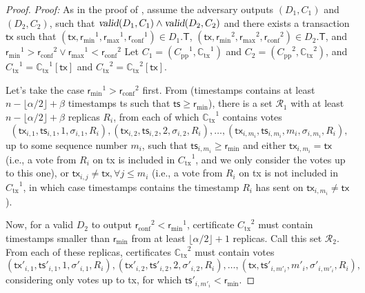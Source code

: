 \documentclass[pdflatex,sn-mathphys-num]{sn-jnl}%
\theoremstyle{thmstyleone}%
\theoremstyle{thmstyletwo}%
\theoremstyle{thmstylethree}%
\newcommand{\CR}{\ensuremath{\mathcal{R}}\xspace}
\newcommand{\op}[1]{\textsl{#1}}
\newcommand{\opMinPossibleTs}[1]{\op{minPossibleTs}(#1)\xspace}
\newcommand{\opValid}[1]{\op{valid}(#1)\xspace}
\newcommand{\operand}[1]{\textsf{#1}}
\newcommand{\tx}{\operand{tx}\xspace}
\newcommand{\round}{\operand{r}\xspace}
\newcommand{\client}{\operand{c}\xspace}
\newcommand{\rconf}{\ensuremath{\round_\text{conf}}\xspace}
\newcommand{\rmin}{\ensuremath{\round_\text{min}}\xspace}
\newcommand{\rmax}{\ensuremath{\round_\text{max}}\xspace}
\newcommand{\rep}{\ensuremath{R}\xspace}
\newcommand{\allreps}{\CR}
\newcommand{\txVotesMin}{\operand{timestamps}\xspace}
\newcommand{\tsp}{\operand{ts}\xspace}
\newcommand{\txcert}{\ensuremath{C_\text{tx}}\xspace}
\newcommand{\alltxcert}{\ensuremath{\mathbb{C}_\text{tx}}\xspace}
\newcommand{\ppcert}{\ensuremath{C_\text{pp}}\xspace}
\newcommand{\cert}{\ensuremath{C}\xspace}
\newcommand{\txSet}{\operand{T}\xspace}
\newcommand{\Pod}{\ensuremath{D}\xspace}
\let\oldalpha\alpha
\renewcommand{\alpha}{\ensuremath{\oldalpha}\xspace}
\let\oldbeta\beta
\renewcommand{\beta}{\ensuremath{\oldbeta}\xspace}
\begin{document}
\begin{appendices}
\begin{proof}
	\noindent
	\emph{Proof:}
	As in the proof of , assume the adversary outputs $(\Pod_1, \cert_1)$ and $(\Pod_2, \cert_2)$, such that $\opValid{\Pod_1, \cert_1} \land \opValid{\Pod_2, \cert_2}$ and there exists a transaction $\tx$ such that $(\tx, \rmin^1, \rmax^1, \rconf^1) \in \Pod_1.\txSet$, $(\tx, \rmin^2, \rmax^2, \rconf^2) \in \Pod_2.\txSet$, and $\rmin^1 > \rconf^2 \lor \rmax^1 < \rconf^2$
	Let $\cert_1 = (\ppcert^1, \alltxcert^1)$ and $\cert_2 = (\ppcert^2, \alltxcert^2)$, and $\txcert^1 = \alltxcert^1[\tx]$ and $\txcert^2 = \alltxcert^2[\tx]$.

	Let's take the case $\rmin^1 > \rconf^2$ first. From  (\txVotesMin contains at least $n - \lfloor \alpha / 2 \rfloor + \beta$ timestamps \tsp such that $\tsp \geq \rmin$), there is a set $\allreps_1$ with at least $n - \lfloor \alpha / 2 \rfloor + \beta$ replicas $\rep_i$, from each of which $\alltxcert^1$ contains votes
	\begin{equation}\label{eq:proof-bounds-set1}
		(\tx_{i,1}, \tsp_{i,1}, 1, \sigma_{i,1}, \rep_i), (\tx_{i,2}, \tsp_{i,2}, 2, \sigma_{i,2}, \rep_i),
		\ldots, (\tx_{i,m_i}, \tsp_{i, m_i}, m_i, \sigma_{i, m_i}, \rep_i),
	\end{equation}
	up to some sequence number $m_i$, such that $\tsp_{i, m_i} \geq \rmin$ and either $\tx_{i,m_i} = \tx$ (i.e., a vote from $\rep_i$ on \tx is included in $\txcert^1$, and we only consider the votes up to this one), or  $\tx_{i, j} \neq \tx, \forall j \leq m_i$ (i.e., a vote from $\rep_i$ on \tx is not included in $\txcert^1$, in which case \txVotesMin contains the timestamp $\rep_i$ has sent on $\tx_{i,m_i} \neq \tx$).

	Now, for a valid $\Pod_2$ to output $\rconf^2 < \rmin^1$, certificate $\txcert^2$ must contain timestamps smaller than \rmin from at least $\lfloor \alpha / 2 \rfloor + 1$ replicas. Call this set $\allreps_2$. From each of these replicas, certificates $\alltxcert^2$ must contain votes
	\begin{equation}\label{eq:proof-bounds-set2}
		(\tx'_{i,1}, \tsp'_{i,1}, 1, \sigma'_{i,1}, \rep_i), (\tx'_{i,2}, \tsp'_{i,2}, 2, \sigma'_{i,2}, \rep_i), \ldots, (\tx, \tsp'_{i, m'_i}, m'_i, \sigma'_{i, m'_i}, \rep_i),
	\end{equation}
	considering only votes up to \tx, for which $\tsp'_{i, m'_i} < \rmin$.


\end{proof}
\end{appendices}
\end{document}
